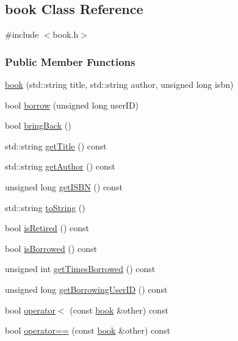 \hypertarget{classbook}{\subsection{book Class Reference}
\label{classbook}
}


{\ttfamily \#include $<$book.\+h$>$}

\subsubsection*{Public Member Functions}
\begin{DoxyCompactItemize}
\item 
\hyperlink{classbook_a5114952cb9ce13311c70a7da4a84f65e}{book} (std\+::string title, std\+::string author, unsigned long isbn)
\item 
bool \hyperlink{classbook_a25a20807ec84c3dd73a2633a4765d1bf}{borrow} (unsigned long user\+I\+D)
\item 
bool \hyperlink{classbook_a0db6fec61d11dfb27f20403569289bbb}{bring\+Back} ()
\item 
std\+::string \hyperlink{classbook_a9f43e517657537cdec67383874f7e2f7}{get\+Title} () const 
\item 
std\+::string \hyperlink{classbook_a6315686670239c79edf19a4989e5ba0c}{get\+Author} () const 
\item 
unsigned long \hyperlink{classbook_a3b91f6e35b42d691b563b709e1440030}{get\+I\+S\+B\+N} () const 
\item 
std\+::string \hyperlink{classbook_ac673df10b3812cf593f02a7c9967a947}{to\+String} ()
\item 
bool \hyperlink{classbook_a526ad98158cb5beed91c81408bbb669e}{is\+Retired} () const 
\item 
bool \hyperlink{classbook_a6dee5eea9f365e991dcdc2b91d491f5a}{is\+Borrowed} () const 
\item 
unsigned int \hyperlink{classbook_a662ce1b3c7bc720749a758c535f07de8}{get\+Times\+Borrowed} () const 
\item 
unsigned long \hyperlink{classbook_a87d5d461e8e248a5f5d6abe1abad2170}{get\+Borrowing\+User\+I\+D} () const 
\item 
bool \hyperlink{classbook_a2a3ee05162274ddc9c12e87f21cfa1c3}{operator$<$} (const \hyperlink{classbook}{book} \&other) const 
\item 
bool \hyperlink{classbook_a38a765453e0934f70cf3d2268adb6e39}{operator==} (const \hyperlink{classbook}{book} \&other) const 
\end{DoxyCompactItemize}


